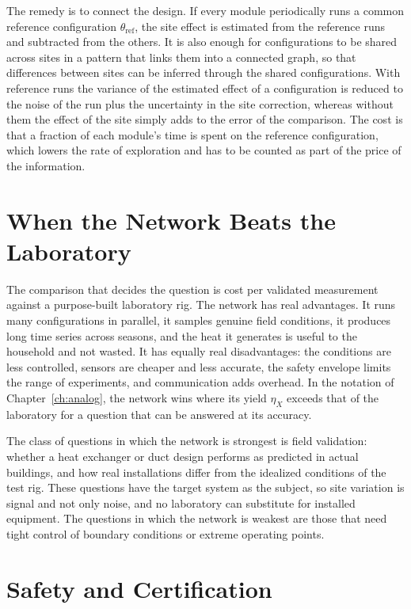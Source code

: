 The remedy is to connect the design. If every module periodically runs a common reference configuration $\theta_{\mathrm{ref}}$, the site effect is estimated from the reference runs and subtracted from the others. It is also enough for configurations to be shared across sites in a pattern that links them into a connected graph, so that differences between sites can be inferred through the shared configurations. With reference runs the variance of the estimated effect of a configuration is reduced to the noise of the run plus the uncertainty in the site correction, whereas without them the effect of the site simply adds to the error of the comparison. The cost is that a fraction of each module's time is spent on the reference configuration, which lowers the rate of exploration and has to be counted as part of the price of the information.

\section{When the Network Beats the Laboratory}

The comparison that decides the question is cost per validated measurement against a purpose-built laboratory rig. The network has real advantages. It runs many configurations in parallel, it samples genuine field conditions, it produces long time series across seasons, and the heat it generates is useful to the household and not wasted. It has equally real disadvantages: the conditions are less controlled, sensors are cheaper and less accurate, the safety envelope limits the range of experiments, and communication adds overhead. In the notation of Chapter~\ref{ch:analog}, the network wins where its yield $\eta_X$ exceeds that of the laboratory for a question that can be answered at its accuracy.

The class of questions in which the network is strongest is field validation: whether a heat exchanger or duct design performs as predicted in actual buildings, and how real installations differ from the idealized conditions of the test rig. These questions have the target system as the subject, so site variation is signal and not only noise, and no laboratory can substitute for installed equipment. The questions in which the network is weakest are those that need tight control of boundary conditions or extreme operating points.

\section{Safety and Certification}

